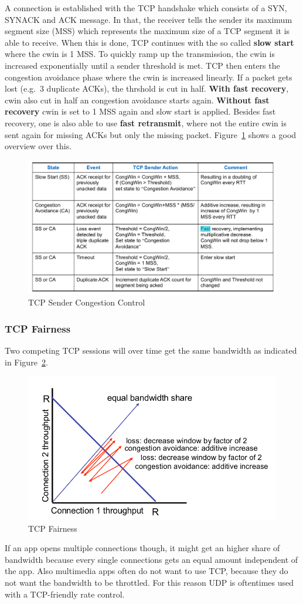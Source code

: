 A connection is established with the TCP handshake which consists of a SYN, SYNACK and ACK message.
In that, the receiver tells the sender its maximum segment size (MSS) which represents the maximum size of a TCP segment it is able to receive.
When this is done, TCP continues with the so called \textbf{slow start} where the cwin is 1 MSS\@.
To quickly ramp up the transmission, the cwin is increased exponentially until a sender threshold is met.
TCP then enters the congestion avoidance phase where the cwin is increased linearly.
If a packet gets lost (e.g.\ 3 duplicate ACKs), the thrshold is cut in half.
\textbf{With fast recovery}, cwin also cut in half an congestion avoidance starts again.
\textbf{Without fast recovery} cwin is set to 1 MSS again and slow start is applied.
Besides fast recovery, one is also able to use \textbf{fast retransmit}, where not the entire cwin is sent again for missing ACKs but only the missing packet.
Figure~\ref{fig:tcp_sender_congestion_control} shows a good overview over this.\\
\begin{figure}[h]
  \centering
  \includegraphics[width=.8\textwidth]{figures/tcp_sender_congestion_control}
  \caption{TCP Sender Congestion Control}\label{fig:tcp_sender_congestion_control}
\end{figure}

\subsubsection*{TCP Fairness}
Two competing TCP sessions will over time get the same bandwidth as indicated in Figure~\ref{fig:tcp_fairness}.
\begin{figure}[h]
  \centering
  \includegraphics[width=.6\textwidth]{figures/tcp_fairness.png}
  \caption{TCP Fairness}\label{fig:tcp_fairness}
\end{figure}
If an app opens multiple connections though, it might get an higher share of bandwidth because every single connections gets an equal amount independent of the app.
Also multimedia apps often do not want to use TCP, because they do not want the bandwidth to be throttled.
For this reason UDP is oftentimes used with a TCP-friendly rate control.

